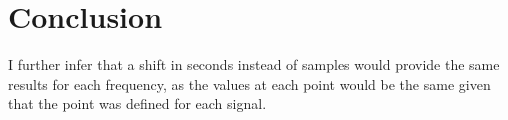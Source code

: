 \section{Conclusion}

I further infer that a shift in seconds instead of samples would provide the same results for each frequency, as the values at each point would be the same given that the point was defined for each signal.
